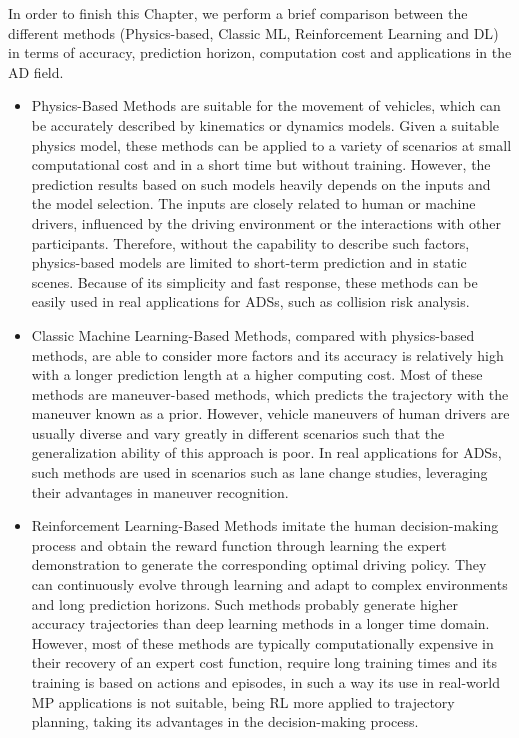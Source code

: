 In order to finish this Chapter, we perform a brief comparison between the different methods (Physics-based, Classic ML, Reinforcement Learning and \ac{DL}) in terms of accuracy, prediction horizon, computation cost and applications in the \ac{AD} field. 

\begin{itemize}
	
	\item Physics-Based Methods are suitable for the movement of vehicles, which can be accurately described by kinematics or dynamics models. Given a suitable physics model, these methods can be applied to a variety of scenarios at small computational cost and in a short time but without training. However, the prediction results based on such models heavily depends on the inputs and the model selection. The inputs are closely related to human or machine drivers, influenced by the driving environment or the interactions with other participants. Therefore, without the capability to describe such factors, physics-based models are limited to short-term prediction and in static scenes. Because of its simplicity and fast response, these methods can be easily used in real applications for \acp{ADS}, such as collision risk analysis.
	
	\item Classic Machine Learning-Based Methods, compared with physics-based methods, are able to consider more factors and its accuracy is relatively high with a longer prediction length at a higher computing cost. Most of these methods are maneuver-based methods, which predicts the trajectory with the maneuver known as a prior. However, vehicle maneuvers of human drivers are usually diverse and vary greatly in different scenarios such that the generalization ability of this approach is poor. In real applications for \acp{ADS}, such methods are used in scenarios such as lane change studies, leveraging their advantages in maneuver recognition.
	
	\item Reinforcement Learning-Based Methods imitate the human decision-making process and obtain the reward function through learning the expert demonstration to generate the corresponding optimal driving policy. They can continuously evolve through learning and adapt to complex environments and long prediction horizons. Such methods probably generate higher accuracy trajectories than deep learning methods in a longer time domain. However, most of these methods are typically computationally expensive in their recovery of an expert cost function, require long training times and its training is based on actions and episodes, in such a way its use in real-world \ac{MP} applications is not suitable, being RL more applied to trajectory planning, taking its advantages in the decision-making process.
	

\end{itemize}

